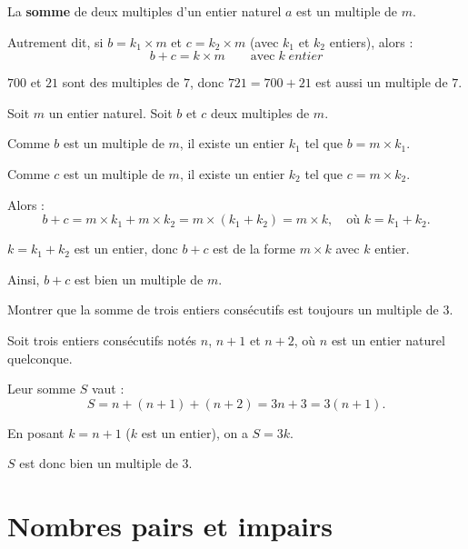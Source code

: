 \begin{propriete}
	La \textbf{somme} de deux multiples d'un entier naturel $a$ est un multiple de $m$.

	Autrement dit, si $b = k_1 \times m$ et $c = k_2 \times m$ (avec $k_1$ et $k_2$ entiers), alors :
	\[
		b + c = k \times m\qquad \text{avec}\; k\; {entier}
	\]
\end{propriete}

\begin{exemple}
	$700$ et $21$ sont des multiples de $7$, donc $721 = 700 + 21$ est aussi un multiple de $7$.
\end{exemple}

\begin{demo}
	Soit $m$ un entier naturel. Soit $b$ et $c$ deux multiples de $m$.

	Comme $b$ est un multiple de $m$, il existe un entier $k_1$ tel que $b = m \times k_1$.

	Comme $c$ est un multiple de $m$, il existe un entier $k_2$ tel que $c = m \times k_2$.

	Alors :
	\[
		b + c = m \times k_1 + m \times k_2 = m \times (k_1 + k_2) = m \times k, \quad \text{où } k = k_1 + k_2.
	\]

	$k = k_1 + k_2$ est un entier, donc $b + c$ est de la forme $m \times k$ avec $k$ entier.

	Ainsi, $b + c$ est bien un multiple de $m$.
\end{demo}

\newpage

\begin{methode}
	Montrer que la somme de trois entiers consécutifs est toujours un multiple de $3$.

	\begin{correction}
		Soit trois entiers consécutifs notés $n$, $n + 1$ et $n + 2$, où $n$ est un entier naturel quelconque.

		Leur somme $S$ vaut :
		\[
			S = n + (n + 1) + (n + 2) = 3n + 3 = 3(n + 1).
		\]

		En posant $k = n + 1$ ($k$ est un entier), on a $S = 3k$.

		$S$ est donc bien un multiple de $3$.
	\end{correction}
\end{methode}

\section{Nombres pairs et impairs}

